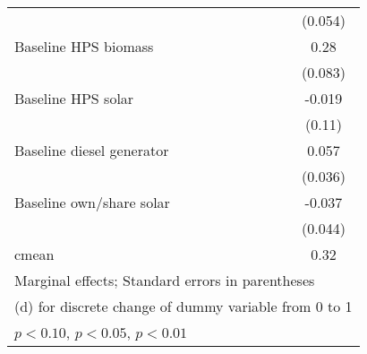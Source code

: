 \begin{table}[htbp]
\begin{tabular*}{1\hsize}{@{\hskip\tabcolsep\extracolsep\fill}l*{5}{c}}
                &                  &                  &                  &                  &  (0.054)         \\
Baseline HPS biomass&                  &                  &                  &                  &     0.28\sym{***}\\
                &                  &                  &                  &                  &  (0.083)         \\
Baseline HPS solar&                  &                  &                  &                  &   -0.019         \\
                &                  &                  &                  &                  &   (0.11)         \\
Baseline diesel generator&                  &                  &                  &                  &    0.057         \\
                &                  &                  &                  &                  &  (0.036)         \\
Baseline own/share solar&                  &                  &                  &                  &   -0.037         \\
                &                  &                  &                  &                  &  (0.044)         \\
\midrule
cmean           &                  &                  &                  &                  &     0.32         \\
\bottomrule
\multicolumn{6}{l}{\footnotesize Marginal effects; Standard errors in parentheses}\\
\multicolumn{6}{l}{\footnotesize  (d) for discrete change of dummy variable from 0 to 1}\\
\multicolumn{6}{l}{\footnotesize \sym{*} \(p<0.10\), \sym{**} \(p<0.05\), \sym{***} \(p<0.01\)}\\
\end{tabular*}
\end{table}
